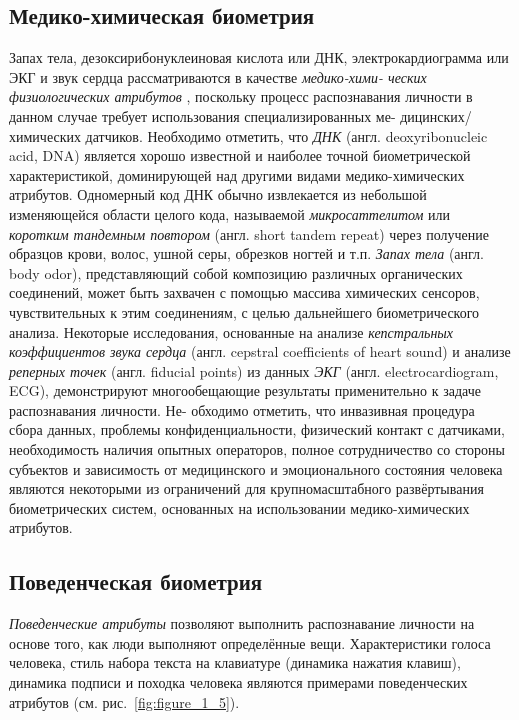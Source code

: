 \documentclass[12pt]{book}
\begin{document}
\subsection{Медико-химическая биометрия}

\large{Запах тела, дезоксирибонуклеиновая кислота или ДНК, электрокардиограмма или ЭКГ и звук сердца рассматриваются в качестве \textit{медико-хими- ческих физиологических атрибутов} \cite{unar_2014}, поскольку процесс распознавания личности в данном случае требует использования специализированных ме- дицинских/химических датчиков. Необходимо отметить, что \textit{ДНК} (англ. deoxyribonucleic acid, DNA) является хорошо известной и наиболее точной биометрической характеристикой, доминирующей над другими видами медико-химических атрибутов. Одномерный код ДНК обычно извлекается из небольшой изменяющейся области целого кода, называемой \textit{микросаттелитом} или \textit{коротким тандемным повтором} (англ. short tandem repeat) через получение образцов крови, волос, ушной серы, обрезков ногтей и т.п. \textit{Запах тела} (англ. body odor), представляющий собой композицию различных органических соединений, может быть захвачен с помощью массива химических сенсоров, чувствительных к этим соединениям, с целью дальнейшего биометрического анализа. Некоторые исследования, основанные на анализе \textit{кепстральных коэффициентов звука сердца} (англ. cepstral coefficients of heart sound) и анализе \textit{реперных точек} (англ. fiducial points) из данных \textit{ЭКГ} (англ. electrocardiogram, ECG), демонстрируют многообещающие результаты применительно к задаче распознавания личности. Не- обходимо отметить, что инвазивная процедура сбора данных, проблемы конфиденциальности, физический контакт с датчиками, необходимость наличия опытных операторов, полное сотрудничество со стороны субъектов и зависимость от медицинского и эмоционального состояния человека являются некоторыми из ограничений для крупномасштабного развёртывания биометрических систем, основанных на использовании медико-химических атрибутов.}

\subsection{Поведенческая биометрия}

\large{\textit{Поведенческие атрибуты} \cite{unar_2014} позволяют выполнить распознавание личности на основе того, как люди выполняют определённые вещи. Характеристики голоса человека, стиль набора текста на клавиатуре (динамика нажатия клавиш), динамика подписи и походка человека являются примерами поведенческих атрибутов (см. рис.~\ref{fig:figure_1_5}).}
\end{document}
